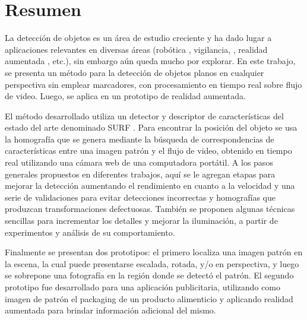 \chapter*{Resumen}
La detección de objetos es un área de estudio creciente y ha dado lugar a aplicaciones relevantes en diversas áreas (robótica \cite{conf/icra/2010}, vigilancia, \cite{5672610}, realidad aumentada \cite{5739718}, etc.), sin embargo aún queda mucho por explorar. En este trabajo, se presenta un método para la detección de objetos planos en cualquier perspectiva sin emplear marcadores, con procesamiento en tiempo real sobre flujo de video. Luego, se aplica en un prototipo de realidad aumentada.

El método desarrollado utiliza un detector y descriptor de características del estado del arte denominado SURF \cite{Bay:2008:SRF}. Para encontrar la posición del objeto se usa la homografía que se genera mediante la búsqueda de correspondencias de características entre una imagen patrón y el flujo de video, obtenido en tiempo real utilizando una cámara web de una computadora portátil. A los pasos generales propuestos en diferentes trabajos, aquí se le agregan etapas para mejorar la detección aumentando el rendimiento en cuanto a la velocidad y una serie de validaciones para evitar detecciones incorrectas y homografías que produzcan transformaciones defectuosas. También se proponen algunas técnicas sencillas para incrementar los detalles y mejorar la iluminación, a partir de experimentos y análisis de su comportamiento.

Finalmente se presentan dos prototipos: el primero localiza una imagen patrón en la escena, la cual puede presentarse escalada, rotada, y/o en perspectiva, y luego se sobrepone una fotografía en la región donde se detectó el patrón. El segundo prototipo fue desarrollado para una aplicación publicitaria, utilizando como imagen de patrón el packaging de un producto alimenticio y aplicando realidad aumentada para brindar información adicional del mismo.